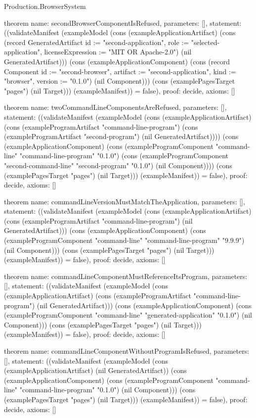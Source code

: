 \begin{lexlean}{Production.BrowserSystem}
\begin{semanticmodule}
theorem{
  name: secondBrowserComponentIsRefused,
  parameters: [],
  statement: ((validateManifest (exampleModel (cons (exampleApplicationArtifact) (cons (record GeneratedArtifact {id := "second-application", role := "selected-application", licenseExpression := "MIT OR Apache-2.0"}) (nil GeneratedArtifact))) (cons (exampleApplicationComponent) (cons (record Component {id := "second-browser", artifact := "second-application", kind := "browser", version := "0.1.0"}) (nil Component))) (cons (examplePagesTarget "pages") (nil Target))) (exampleManifest)) = false),
  proof: decide{},
  axioms: []
}

theorem{
  name: twoCommandLineComponentsAreRefused,
  parameters: [],
  statement: ((validateManifest (exampleModel (cons (exampleApplicationArtifact) (cons (exampleProgramArtifact "command-line-program") (cons (exampleProgramArtifact "second-program") (nil GeneratedArtifact)))) (cons (exampleApplicationComponent) (cons (exampleProgramComponent "command-line" "command-line-program" "0.1.0") (cons (exampleProgramComponent "second-command-line" "second-program" "0.1.0") (nil Component)))) (cons (examplePagesTarget "pages") (nil Target))) (exampleManifest)) = false),
  proof: decide{},
  axioms: []
}

theorem{
  name: commandLineVersionMustMatchTheApplication,
  parameters: [],
  statement: ((validateManifest (exampleModel (cons (exampleApplicationArtifact) (cons (exampleProgramArtifact "command-line-program") (nil GeneratedArtifact))) (cons (exampleApplicationComponent) (cons (exampleProgramComponent "command-line" "command-line-program" "9.9.9") (nil Component))) (cons (examplePagesTarget "pages") (nil Target))) (exampleManifest)) = false),
  proof: decide{},
  axioms: []
}

theorem{
  name: commandLineComponentMustReferenceItsProgram,
  parameters: [],
  statement: ((validateManifest (exampleModel (cons (exampleApplicationArtifact) (cons (exampleProgramArtifact "command-line-program") (nil GeneratedArtifact))) (cons (exampleApplicationComponent) (cons (exampleProgramComponent "command-line" "generated-application" "0.1.0") (nil Component))) (cons (examplePagesTarget "pages") (nil Target))) (exampleManifest)) = false),
  proof: decide{},
  axioms: []
}

theorem{
  name: commandLineComponentWithoutProgramIsRefused,
  parameters: [],
  statement: ((validateManifest (exampleModel (cons (exampleApplicationArtifact) (nil GeneratedArtifact)) (cons (exampleApplicationComponent) (cons (exampleProgramComponent "command-line" "command-line-program" "0.1.0") (nil Component))) (cons (examplePagesTarget "pages") (nil Target))) (exampleManifest)) = false),
  proof: decide{},
  axioms: []
}


\end{semanticmodule}
\end{lexlean}
